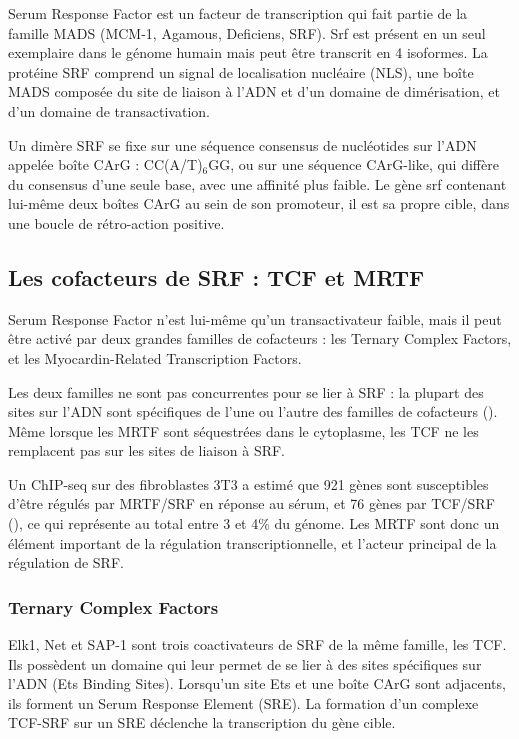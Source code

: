 Serum Response Factor est un facteur de transcription qui fait partie de la famille MADS (MCM-1, Agamous, Deficiens, SRF). Srf est présent en un seul exemplaire dans le génome humain mais peut être transcrit en 4 isoformes. 
La protéine SRF comprend un signal de localisation nucléaire (NLS), une boîte MADS composée du site de liaison à l'ADN et d'un domaine de dimérisation, et d'un domaine de transactivation. 

Un dimère SRF se fixe sur une séquence consensus de nucléotides sur l'ADN appelée boîte CArG : CC(A/T)$_{6}$GG, ou sur une séquence CArG-like, qui diffère du consensus d'une seule base, avec une affinité plus faible. Le gène srf contenant lui-même deux boîtes CArG au sein de son promoteur, il est sa propre cible, dans une boucle de rétro-action positive. 

\subsection{Les cofacteurs de SRF : TCF et MRTF}

Serum Response Factor n'est lui-même qu'un transactivateur faible, mais il peut être activé par deux grandes familles de cofacteurs : les Ternary Complex Factors, et les Myocardin-Related Transcription Factors. 

Les deux familles ne sont pas concurrentes pour se lier à SRF : la plupart des sites sur l'ADN sont spécifiques de l'une ou l'autre des familles de cofacteurs (\cite{esnault_rho-actin_2014}). Même lorsque les MRTF sont séquestrées dans le cytoplasme, les TCF ne les remplacent pas sur les sites de liaison à SRF. 

Un ChIP-seq sur des fibroblastes 3T3 a estimé que 921 gènes sont susceptibles d'être régulés par MRTF/SRF en réponse au sérum, et 76 gènes par TCF/SRF (\cite{esnault_rho-actin_2014}), ce qui représente au total entre 3 et 4\% du génome. Les MRTF sont donc un élément important de la régulation transcriptionnelle, et l'acteur principal de la régulation de SRF. 


\subsubsection{Ternary Complex Factors}

Elk1, Net et SAP-1 sont trois coactivateurs de SRF de la même famille, les TCF. Ils possèdent un domaine qui leur permet de se lier à des sites spécifiques sur l'ADN (Ets Binding Sites). 
Lorsqu'un site Ets et une boîte CArG sont adjacents, ils forment un Serum Response Element (SRE). La formation d'un complexe TCF-SRF sur un SRE déclenche la transcription du gène cible. 

